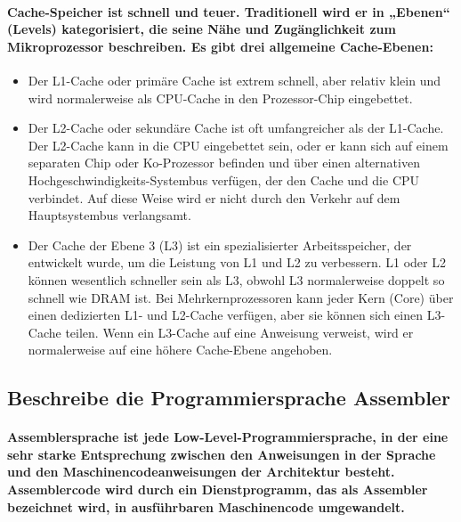 \documentclass[a4paper]{article}
\begin{document}
    \paragraph{\color{red}Cache-Speicher ist schnell und teuer. Traditionell wird er in „Ebenen“ (Levels) kategorisiert, die seine Nähe und Zugänglichkeit zum Mikroprozessor beschreiben. Es gibt drei allgemeine Cache-Ebenen:}
    \begin{itemize}
        \color{magenta}
        \item {\fbseries Der L1-Cache } oder primäre Cache ist extrem schnell, aber relativ klein und wird normalerweise als CPU-Cache in den Prozessor-Chip eingebettet.
        \item {\fbseries Der L2-Cache } oder sekundäre Cache ist oft umfangreicher als der L1-Cache.
        Der L2-Cache kann in die CPU eingebettet sein, oder er kann sich auf einem separaten Chip oder Ko-Prozessor befinden und über einen alternativen Hochgeschwindigkeits-Systembus verfügen, der den Cache und die CPU verbindet.
        Auf diese Weise wird er nicht durch den Verkehr auf dem Hauptsystembus verlangsamt.
        \item {\fbseries Der Cache } der Ebene 3 (L3) ist ein spezialisierter Arbeitsspeicher, der entwickelt wurde, um die Leistung von L1 und L2 zu verbessern.
        L1 oder L2 können wesentlich schneller sein als L3, obwohl L3 normalerweise doppelt so schnell wie DRAM ist.
        Bei Mehrkernprozessoren kann jeder Kern (Core) über einen dedizierten L1- und L2-Cache verfügen, aber sie können sich einen L3-Cache teilen.
        Wenn ein L3-Cache auf eine Anweisung verweist, wird er normalerweise auf eine höhere Cache-Ebene angehoben.
    \end{itemize}

    \subsection{\color{red}Beschreibe die Programmiersprache Assembler}\label{subsec:beschreibe-die-programmiersprache-assembler}
    \paragraph{\color{codegreen} Assemblersprache ist jede Low-Level-Programmiersprache, in der eine sehr starke Entsprechung zwischen den Anweisungen in der Sprache und den Maschinencodeanweisungen der Architektur besteht.
    Assemblercode wird durch ein Dienstprogramm, das als Assembler bezeichnet wird, in ausführbaren Maschinencode umgewandelt. }
    
\end{document}
